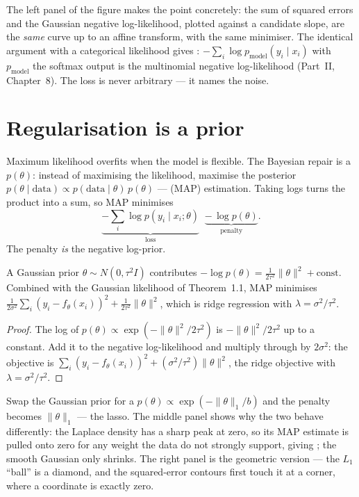 \documentclass[11pt]{article}
\begin{document}
\noindent The left panel of the figure makes the point concretely: the sum of
squared errors and the Gaussian negative log-likelihood, plotted against a
candidate slope, are the \emph{same} curve up to an affine transform, with the
same minimiser. The identical argument with a categorical likelihood gives
: $-\sum_i \log p_{\text{model}}(y_i\mid x_i)$ with
$p_{\text{model}}$ the softmax output is the multinomial negative log-likelihood
(Part~II, Chapter~8). The loss is never arbitrary --- it names the noise.

\section{Regularisation is a prior}

Maximum likelihood overfits when the model is flexible. The Bayesian repair is a
 $p(\theta)$: instead of maximising the likelihood, maximise the
posterior $p(\theta\mid \text{data}) \propto p(\text{data}\mid\theta)\,p(\theta)$
---  (MAP) estimation. Taking logs turns the product
into a sum, so MAP minimises
\[
  \underbrace{-\sum_i \log p(y_i\mid x_i;\theta)}_{\text{loss}}
  \;\; \underbrace{-\,\log p(\theta)}_{\text{penalty}}.
\]
The penalty \emph{is} the negative log-prior.

\begin{theorem}
A Gaussian prior $\theta\sim N(0,\tau^2 I)$ contributes
$-\log p(\theta) = \tfrac{1}{2\tau^2}\|\theta\|^2 + \text{const}$. Combined with
the Gaussian likelihood of Theorem~1.1, MAP minimises
$\tfrac{1}{2\sigma^2}\sum_i(y_i-f_\theta(x_i))^2 + \tfrac{1}{2\tau^2}\|\theta\|^2$,
which is ridge regression with $\lambda = \sigma^2/\tau^2$.
\end{theorem}
\begin{proof}
The log of $p(\theta)\propto \exp(-\|\theta\|^2/2\tau^2)$ is
$-\|\theta\|^2/2\tau^2$ up to a constant. Add it to the negative log-likelihood
and multiply through by $2\sigma^2$: the objective is
$\sum_i(y_i-f_\theta(x_i))^2 + (\sigma^2/\tau^2)\|\theta\|^2$, the ridge objective
with $\lambda=\sigma^2/\tau^2$.
\end{proof}

Swap the Gaussian prior for a 
$p(\theta)\propto \exp(-\|\theta\|_1/b)$ and the penalty becomes
$\|\theta\|_1$ --- the lasso. The middle panel shows why the two behave
differently: the Laplace density has a sharp peak at zero, so its MAP estimate is
pulled onto zero for any weight the data do not strongly support, giving
; the smooth Gaussian only shrinks. The right panel is the
geometric version --- the $L_1$ ``ball'' is a diamond, and the squared-error
contours first touch it at a corner, where a coordinate is exactly zero.
\end{document}
